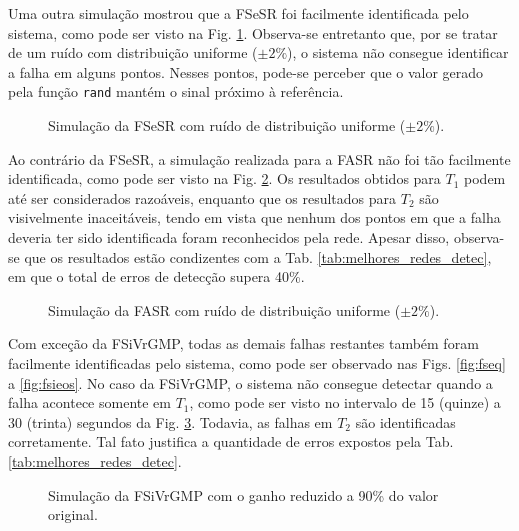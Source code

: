 Uma outra simulação mostrou que a FSeSR foi facilmente identificada pelo
sistema, como pode ser visto na Fig. \ref{fig:fsesr}. Observa-se entretanto que,
por se tratar de um ruído com distribuição uniforme ($\pm 2\%$), o sistema não
consegue identificar a falha em alguns pontos. Nesses pontos, pode-se perceber
que o valor gerado pela função {\tt rand} mantém o sinal próximo à referência.

\begin{figure}[htb]
\footnotesize
\centering

\vspace{1cm}
\caption{Simulação da FSeSR com ruído de distribuição uniforme ($\pm 2\%$).}
\label{fig:fsesr}
\end{figure}

Ao contrário da FSeSR, a simulação realizada para a FASR não foi tão facilmente
identificada, como pode ser visto na Fig. \ref{fig:fasr}. Os resultados obtidos
para $T_1$ podem até ser considerados razoáveis, enquanto que os resultados para
$T_2$ são visivelmente inaceitáveis, tendo em vista que nenhum dos pontos em que
a falha deveria ter sido identificada foram reconhecidos pela rede. Apesar
disso, observa-se que os resultados estão condizentes com a Tab.
\ref{tab:melhores_redes_detec}, em que o total de erros de detecção supera 40\%.

\begin{figure}[htb] 
\footnotesize 
\centering 

\vspace{1cm} 
\caption{Simulação da FASR com ruído de distribuição uniforme ($\pm 2\%$).} 
\label{fig:fasr} 
\end{figure}

Com exceção da FSiVrGMP, todas as demais falhas restantes também foram
facilmente identificadas pelo sistema, como pode ser observado nas Figs.
\ref{fig:fseq} a \ref{fig:fsieos}. No caso da FSiVrGMP, o sistema não consegue
detectar quando a falha acontece somente em $T_1$, como pode ser visto no
intervalo de 15 (quinze) a 30 (trinta) segundos da Fig. \ref{fig:fsivrgmp}.
Todavia, as falhas em $T_2$ são identificadas corretamente. Tal fato justifica a
quantidade de erros expostos pela Tab. \ref{tab:melhores_redes_detec}.

\begin{figure}[htb]
\footnotesize
\centering

\vspace{1cm}
\caption{Simulação da FSiVrGMP com o ganho reduzido a 90\% do valor original.}
\label{fig:fsivrgmp}
\end{figure}

